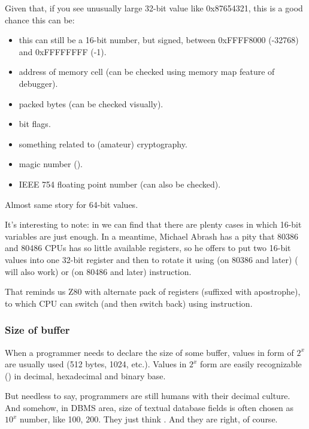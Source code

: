 Given that, if you see unusually large 32-bit value like 0x87654321, this is a good chance this can be:

\begin{itemize}

\item this can still be a 16-bit number, but signed, between 0xFFFF8000 (-32768) and 0xFFFFFFFF (-1).
\item address of memory cell (can be checked using memory map feature of debugger).
\item packed bytes (can be checked visually).
\item bit flags.
\item something related to (amateur) cryptography.
\item magic number ().
\item IEEE 754 floating point number (can also be checked).

\end{itemize}

Almost same story for 64-bit values.


It's interesting to note: in 
we can find that there are plenty cases in which 16-bit variables are just enough.
In a meantime, Michael Abrash has a pity that 80386 and 80486 CPUs has so little available registers, so he offers to put
two 16-bit values into one 32-bit register and then to rotate it using
 (on 80386 and later) ( will also work) or 
 (on 80486 and later) instruction.

That reminds us Z80 with alternate pack of registers (suffixed with apostrophe), to which CPU can switch
(and then switch back) using  instruction.

\subsubsection{Size of buffer}

When a programmer needs to declare the size of some buffer, values in form of $2^x$ are usually used (512 bytes, 1024, etc.).
Values in $2^x$ form are easily recognizable () in decimal, hexadecimal and binary base.

But needless to say, programmers are still humans with their decimal culture.
And somehow, in \ac{DBMS} area, size of textual database fields is often chosen as $10^x$ number, like 100, 200.
They just think .
And they are right, of course.

